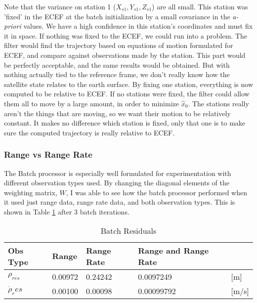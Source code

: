 \documentclass[12pt,a4paper,oneside]{article}
\numberwithin{equation}{section}   		%
\begin{document}
Note that the variance on station 1 ($X_{s1}, Y_{s1}, Z_{s1}$) are all small. This station was 'fixed' in the ECEF at the batch initialization by a small covariance in the \emph{a-priori} values. We have a high confidence in this station's coordinates and must fix it in space. If nothing was fixed to the ECEF, we could run into a problem. The filter would find the trajectory based on equations of motion formulated for ECEF, and compare against observations made by the station. This part would be perfectly acceptable, and the same results would be obtained. But with nothing actually tied to the reference frame, we don't really know how the satellite state relates to the earth surface. By fixing one station, everything is now computed to be relative to ECEF. If no stations were fixed, the filter could allow them all to move by a large amount, in order to minimize $\hat{x}_0$. The stations really aren't the things that are moving, so we want their motion to be relatively constant. It makes no difference which station is fixed, only that one is to make sure the computed trajectory is really relative to ECEF.



\subsubsection{Range vs Range Rate}
\label{sec:Range Range Rate}

The Batch processor is especially well formulated for experimentation with different observation types used. By changing the diagonal elements of the weighting matrix, $W$, I was able to see how the batch processor performed when it used just range data, range rate data, and both observation types. This is shown in Table \ref{tab:Batch Obs Compare} after 3 batch iterations. 


\begin{table}[H]
\centering
	\begin{tabular}{|l|l|l|l|l|}
		\hline
		\textbf{Obs Type}	&	\textbf{Range}	& \textbf{Range Rate}	& 	\textbf{Range and Range Rate} & \\\hline	
		$\rho_{res}$		&	0.00972&	0.24242		&	0.0097249	& [m]		\\\hline
		$\dot{\rho}_res$	&	0.00100	&	0.00098	&	0.00099792	& [m/s] 	\\\hline
	\end{tabular}
	\caption{Batch Residuals}
	\label{tab:Batch Obs Compare}
\end{table}
\end{document}
